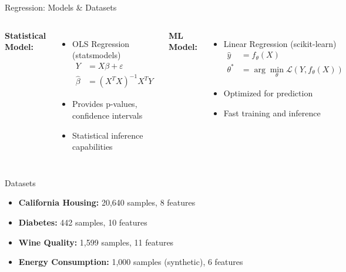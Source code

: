 \documentclass[aspectratio=169,10pt]{beamer}
\begin{document}
\begin{frame}{Regression: Models \& Datasets}
\begin{columns}
\textcolor{statcolor}{\textbf{Statistical Model:}}
\begin{itemize}
    \item OLS Regression (statsmodels)
    \begin{align*}
    Y &= X\beta + \varepsilon \\
    \hat{\beta} &= (X^T X)^{-1} X^T Y
    \end{align*}
    \item Provides p-values, confidence intervals
    \item Statistical inference capabilities
\end{itemize}

\textcolor{mlcolor}{\textbf{ML Model:}}
\begin{itemize}
    \item Linear Regression (scikit-learn)
    \begin{align*}
    \hat{y} &= f_\theta(X) \\
    \theta^* &= \arg\min_\theta \mathcal{L}(Y, f_\theta(X))
    \end{align*}
    \item Optimized for prediction
    \item Fast training and inference
\end{itemize}
\end{columns}

\vspace{0.5cm}

\begin{block}{Datasets}
\begin{itemize}
    \item \textbf{California Housing:} 20,640 samples, 8 features
    \item \textbf{Diabetes:} 442 samples, 10 features
    \item \textbf{Wine Quality:} 1,599 samples, 11 features
    \item \textbf{Energy Consumption:} 1,000 samples (synthetic), 6 features
\end{itemize}
\end{block}
\end{frame}
\end{document}
